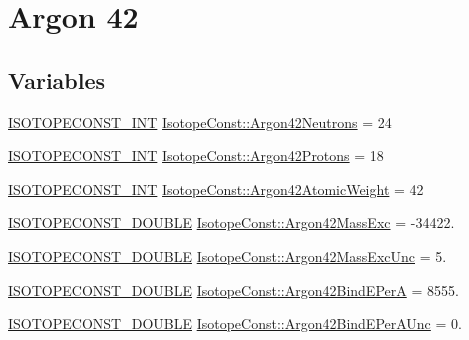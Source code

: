 \hypertarget{group___isotope_const-_argon-_ar42}{}\section{Argon 42}
\label{group___isotope_const-_argon-_ar42}
\subsection*{Variables}
\begin{DoxyCompactItemize}
\item 
\mbox{\hyperlink{group___isotope_const-_macros_ga5f18360b3e99483a35c32d789e62621c}{I\+S\+O\+T\+O\+P\+E\+C\+O\+N\+S\+T\+\_\+\+I\+NT}} \mbox{\hyperlink{group___isotope_const-_argon-_ar42_gaa3777fee75cb328b01c90c9614afb4ad}{Isotope\+Const\+::\+Argon42\+Neutrons}} = 24
\item 
\mbox{\hyperlink{group___isotope_const-_macros_ga5f18360b3e99483a35c32d789e62621c}{I\+S\+O\+T\+O\+P\+E\+C\+O\+N\+S\+T\+\_\+\+I\+NT}} \mbox{\hyperlink{group___isotope_const-_argon-_ar42_gaf84cebf769adfe37586fbff37ff7651a}{Isotope\+Const\+::\+Argon42\+Protons}} = 18
\item 
\mbox{\hyperlink{group___isotope_const-_macros_ga5f18360b3e99483a35c32d789e62621c}{I\+S\+O\+T\+O\+P\+E\+C\+O\+N\+S\+T\+\_\+\+I\+NT}} \mbox{\hyperlink{group___isotope_const-_argon-_ar42_gab7e28bc0aa5275e2d3e039194626bc94}{Isotope\+Const\+::\+Argon42\+Atomic\+Weight}} = 42
\item 
\mbox{\hyperlink{group___isotope_const-_macros_ga8f45a7272ce02c0b4c65c44636ed719a}{I\+S\+O\+T\+O\+P\+E\+C\+O\+N\+S\+T\+\_\+\+D\+O\+U\+B\+LE}} \mbox{\hyperlink{group___isotope_const-_argon-_ar42_ga2fcaa45f3a455b4cfd601e067bdcc672}{Isotope\+Const\+::\+Argon42\+Mass\+Exc}} = -\/34422.
\item 
\mbox{\hyperlink{group___isotope_const-_macros_ga8f45a7272ce02c0b4c65c44636ed719a}{I\+S\+O\+T\+O\+P\+E\+C\+O\+N\+S\+T\+\_\+\+D\+O\+U\+B\+LE}} \mbox{\hyperlink{group___isotope_const-_argon-_ar42_ga45d6f2eece9c7e1417e4c95c2a52d5d9}{Isotope\+Const\+::\+Argon42\+Mass\+Exc\+Unc}} = 5.
\item 
\mbox{\hyperlink{group___isotope_const-_macros_ga8f45a7272ce02c0b4c65c44636ed719a}{I\+S\+O\+T\+O\+P\+E\+C\+O\+N\+S\+T\+\_\+\+D\+O\+U\+B\+LE}} \mbox{\hyperlink{group___isotope_const-_argon-_ar42_ga0a27a6a59fea7d6dc63afbd15db0f8d8}{Isotope\+Const\+::\+Argon42\+Bind\+E\+PerA}} = 8555.
\item 
\mbox{\hyperlink{group___isotope_const-_macros_ga8f45a7272ce02c0b4c65c44636ed719a}{I\+S\+O\+T\+O\+P\+E\+C\+O\+N\+S\+T\+\_\+\+D\+O\+U\+B\+LE}} \mbox{\hyperlink{group___isotope_const-_argon-_ar42_ga1b0d79fefa5c907b2c237f11b27991dc}{Isotope\+Const\+::\+Argon42\+Bind\+E\+Per\+A\+Unc}} = 0.

\end{DoxyCompactItemize}
